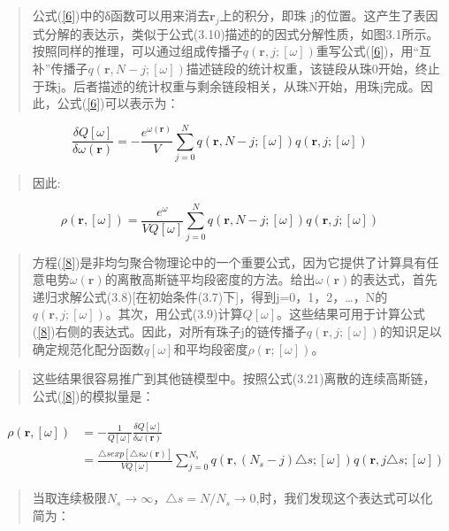 \begin{quotation}
公式(\ref{6})中的δ函数可以用来消去$\mathbf{r}_{j}$上的积分，即珠 j的位置。这产生了表因式分解的表达示，类似于公式(3.10)描述的的因式分解性质，如图3.1所示。按照同样的推理，可以通过组成传播子$q(\mathbf{r},j;[\omega])$重写公式(\ref{6})，用“互补”传播子$q(\mathbf{r},N-j;[\omega])$描述链段的统计权重，该链段从珠0开始，终止于珠j。后者描述的统计权重与剩余链段相关，从珠N开始，用珠j完成。因此，公式(\ref{6})可以表示为：
\end{quotation}
\begin{equation}\label{7}
\frac{\delta Q[\omega]}{\delta \omega(\mathbf{\mathbf{\mathbf{r}}})}=-\frac{e^{\omega(\mathbf{r})}}{V}\sum_{j=0}^{N}q(\mathbf{r},N-j;[\omega])q(\mathbf{r},j;[\omega])
\end{equation}
\begin{quotation}
因此:	
\end{quotation}
\begin{equation}\label{8}
\rho(\mathbf{r},[\omega])=\frac{e^{\omega}}{VQ[\omega]}\sum_{j=0}^{N}q(\mathbf{r},N-j;[\omega])q(\mathbf{r},j;[\omega])
\end{equation}
\begin{quotation}
方程(\ref{8})是非均匀聚合物理论中的一个重要公式，因为它提供了计算具有任意电势$\omega(\mathbf{r})$的离散高斯链平均段密度的方法。给出$\omega(\mathbf{r})$的表达式，首先递归求解公式(3.8)[在初始条件(3.7)下]，得到j=0，1，2，…，N的$q(\mathbf{r},j;[\omega])$。其次，用公式(3.9)计算$Q[\omega]$。这些结果可用于计算公式(\ref{8})右侧的表达式。因此，对所有珠子j的链传播子$q(\mathbf{r},j;[\omega])$的知识足以确定规范化配分函数$q[\omega]$和平均段密度$\rho(\mathbf{r};[\omega])$。
\end{quotation}
\begin{quotation}
这些结果很容易推广到其他链模型中。按照公式(3.21)离散的连续高斯链，公式(\ref{8})的模拟量是：
\end{quotation}
\begin{align}\label{9}
\begin{split}
\rho(\mathbf{r},[\omega])&=-\frac{1}{Q[\omega]}\frac{\delta Q[\omega]}{\delta \omega(\mathbf{r})}\\ &=\frac{\triangle s exp[\triangle s\omega(\mathbf{r})]}{VQ[\omega]}\sum_{j=0}^{N_s}q(\mathbf{r},(N_s-j)\triangle s;[\omega])q(\mathbf{r},j\triangle s;[\omega])
\end{split}
\end{align}
\begin{quotation}
当取连续极限$N_s\to \infty$，$\triangle s=N/N_s\to 0$,时，我们发现这个表达式可以化简为：
\end{quotation}
